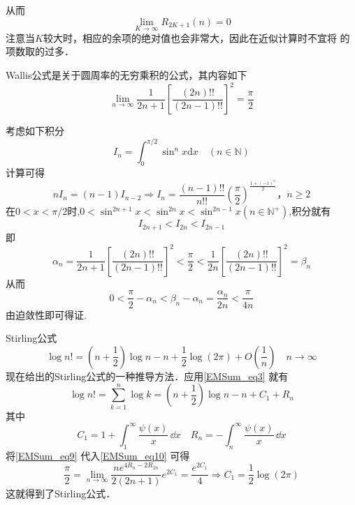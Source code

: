 从而
\[
    \lim\limits_{K\to\infty}R_{2K+1}(n)=0	
\]
注意当$K$较大时，相应的余项的绝对值也会非常大，因此在近似计算时不宜将 的项数取的过多．
\begin{lemma}{}
Wallis公式是关于圆周率的无穷乘积的公式，其内容如下
		\begin{equation}\label{EMSum_eq10}
			\lim_{n\to\infty}\frac{1}{2n+1}\left[\frac{(2n)!!}{(2n-1)!!}\right]^2=\frac{\pi}{2}
		\end{equation}
\end{lemma}
考虑如下积分
\begin{equation}
    I_{n}=\int_{0}^{\pi/2}\sin^{n}x\mathrm{d}x\quad(n\in{\mathbb{N}})
\end{equation}
计算可得
\[
    nI_{n}=(n-1)I_{n-2}\Rightarrow I_{n}=\frac{(n-1)!!}{n!!}
    \left(\frac{\pi}{2}\right)^{\frac{1+(-1)^n}{2}}，n\geqslant2
\]
在$0<x<\pi/2$时,$0<\sin^{2n+1}x<\sin^{2n}x<\sin^{2n-1}x(n\in{\mathbb{N}^{+}})$,积分就有
\[
    I_{2n+1}<I_{2n}<I_{2n-1}
\]
即
\[
    \alpha_{n}=\frac{1}{2n+1}\left[\frac{(2n)!!}{(2n-1)!!}\right]^2<\frac{\pi}{2}<\frac{1}{2n}\left[\frac{(2n)!!}{(2n-1)!!}\right]^2=\beta_{n}
\]
从而
\[
    0<\frac{\pi}{2}-\alpha_{n}<\beta_{n}-\alpha_{n}=\frac{\alpha_{n}}{2n}<\frac{\pi}{4n}
\]
由迫敛性即可得证.
\begin{example}{Stirling公式}
\begin{equation}
    \log n!=\left(n+\frac{1}{2}\right)\log n-n+\frac{1}{2}\log(2\pi)
    +O\left(\frac{1}{n}\right)\quad n\to\infty
\end{equation}
现在给出的Stirling公式的一种推导方法．应用\autoref{EMSum_eq3} 就有
\begin{equation}\label{EMSum_eq9}
    \log n!=\sum_{k=1}^{n}\log k=\left(n+\frac{1}{2}\right)\log n-n+C_{1}+R_{n}
\end{equation}
其中
\[
    C_{1}=1+\int_{1}^{\infty}\frac{\psi(x)}{x}\,\dd x\quad
    R_{n}=-\int_{n}^{\infty}\frac{\psi(x)}{x}\,\dd x
\]
将\autoref{EMSum_eq9} 代入\autoref{EMSum_eq10} 可得
\[
    \frac{\pi}{2}=\lim_{n\to\infty}\frac{ne^{4R_n-2R_{2n}}}{2(2n+1)}e^{2C_{1}}
    =\frac{e^{2C_{1}}}{4}\Rightarrow C_{1}=\frac{1}{2}\log(2\pi)
\]
这就得到了Stirling公式．
\end{example}
